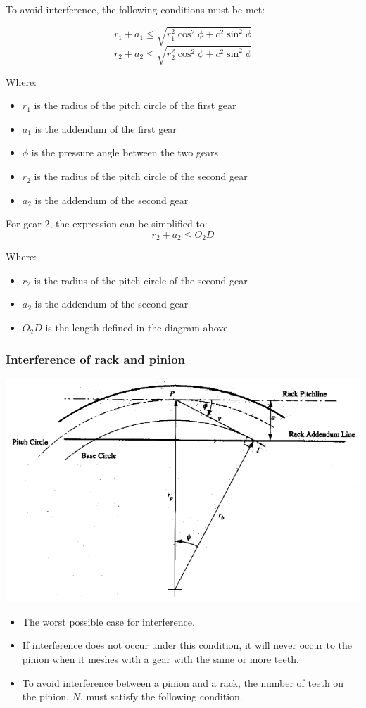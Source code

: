 \documentclass[11pt]{article}
\begin{document}
To avoid interference, the following conditions must be met:

\[r_1 + a_1 \le \sqrt{r_1^2 \cos^2 \phi + c^2 \sin^2 \phi}\]
\[r_2 + a_2 \le \sqrt{r_2^2 \cos^2 \phi + c^2 \sin^2 \phi}\]

Where:
\begin{itemize}
\item \(r_1\) is the radius of the pitch circle of the first gear
\item \(a_1\) is the addendum of the first gear
\item \(\phi\) is the pressure angle between the two gears
\item \(r_2\) is the radius of the pitch circle of the second gear
\item \(a_2\) is the addendum of the second gear
\end{itemize}

For gear 2, the expression can be simplified to:
\[r_2 + a_2 \le O_2 D\]

Where:
\begin{itemize}
\item \(r_2\) is the radius of the pitch circle of the second gear
\item \(a_2\) is the addendum of the second gear
\item \(O_2 D\) is the length defined in the diagram above
\end{itemize}
\subsubsection{Interference of rack and pinion}
\label{sec:orga4b3669}
\begin{center}
\includegraphics[width=.9\linewidth]{./images/interference-of-rack-and-pinion-diagram.png}
\end{center}
\begin{itemize}
\item The worst possible case for interference.
\item If interference does not occur under this condition, it will never occur to the pinion when it meshes with a gear with the same or more teeth.
\item To avoid interference between a pinion and a rack, the number of teeth on the pinion, \(N\), must satisfy the following condition.
\end{itemize}
\end{document}
